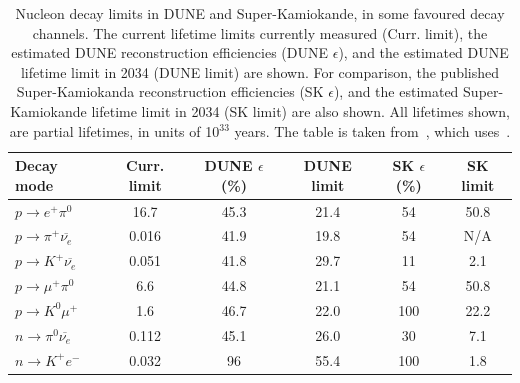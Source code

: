 \begin{table}
  \caption[Nucleon decay limits in DUNE and Super-Kamiokande, in some favoured decay channels]
          {Nucleon decay limits in DUNE and Super-Kamiokande, in some favoured decay channels. The current lifetime limits currently measured (Curr. limit), the estimated DUNE reconstruction efficiencies (DUNE $\epsilon$), and the estimated DUNE lifetime limit in 2034 (DUNE limit) are shown. For comparison, the published Super-Kamiokanda reconstruction efficiencies (SK $\epsilon$), and the estimated Super-Kamiokande lifetime limit in 2034 (SK limit) are also shown. All lifetimes shown, are partial lifetimes, in units of 10$^{33}$ years. The table is taken from~\citep{MauryLifetime}, which uses~\citep{PDGReview}.}
  \centering
  \label{tab:NDKLim}
  \begin{tabular}{l c c c c c}
    \toprule
    {Decay mode}                               & {Curr. limit} & {DUNE $\epsilon$ (\%)} & {DUNE limit} & {SK $\epsilon$ (\%)} & {SK limit} \\ 
    \midrule
    $p \rightarrow e^{+} \pi^{0}$              & 16.7          & 45.3              & 21.4         & 54              & 50.8       \\
    
    $p \rightarrow \pi^{+} \overline{\nu_{e}}$ & 0.016         & 41.9              & 19.8         & 54              & N/A        \\
    
    $p \rightarrow K^{+} \overline{\nu_{e}}$   & 0.051         & 41.8              & 29.7         & 11              & 2.1        \\
    
    $p \rightarrow \mu^{+} \pi^{0}$            & 6.6           & 44.8              & 21.1         & 54              & 50.8       \\
    
    $p \rightarrow K^{0} \mu^{+}$              & 1.6           & 46.7              & 22.0         & 100             & 22.2       \\
    
    $n \rightarrow \pi^{0} \overline{\nu_{e}}$ & 0.112         & 45.1              & 26.0         & 30              & 7.1        \\
    
    $n \rightarrow K^{+} e^{-}$                & 0.032         & 96                & 55.4         & 100             & 1.8        \\
    \bottomrule
  \end{tabular}
\end{table}

